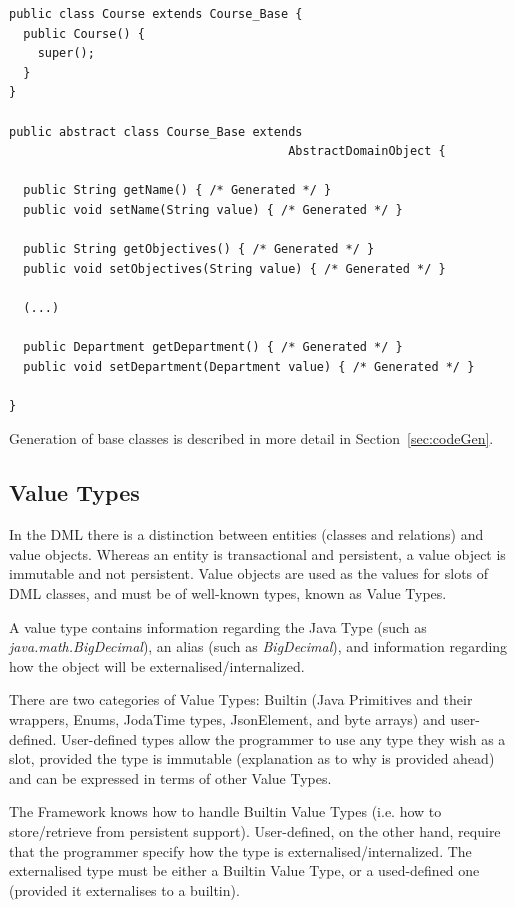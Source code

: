 \begin{lstlisting}[caption={Generated Course class},
label={list:courseCode}]
public class Course extends Course_Base {
  public Course() {
    super();
  }
}

public abstract class Course_Base extends
                                       AbstractDomainObject {

  public String getName() { /* Generated */ }
  public void setName(String value) { /* Generated */ }

  public String getObjectives() { /* Generated */ }
  public void setObjectives(String value) { /* Generated */ }

  (...)

  public Department getDepartment() { /* Generated */ }
  public void setDepartment(Department value) { /* Generated */ }

}
\end{lstlisting}

Generation of base classes is described in more detail in
Section~\ref{sec:codeGen}.

\subsection{Value Types}

In the DML there is a distinction between entities (classes and
relations) and value objects. Whereas an entity is transactional and
persistent, a value object is immutable and not persistent. Value
objects are used as the values for slots of DML classes, and must be
of well-known types, known as Value Types.

A value type contains information regarding the Java Type (such as
{\it java.math.BigDecimal}), an alias (such as {\it BigDecimal}), and information
regarding how the object will be externalised/internalized. 

There are two categories of Value Types: Builtin (Java Primitives and
their wrappers, Enums, JodaTime types, JsonElement, and byte arrays)
and user-defined. User-defined types allow the programmer to use any
type they wish as a slot, provided the type is immutable (explanation
as to why is provided ahead) and can be expressed in terms of other
Value Types.

The Framework knows how to handle Builtin Value Types (i.e. how to
store/retrieve from persistent support). User-defined, on the other
hand, require that the programmer specify how the type is
externalised/internalized. The externalised type must be either a
Builtin Value Type, or a used-defined one (provided it externalises to
a builtin).

